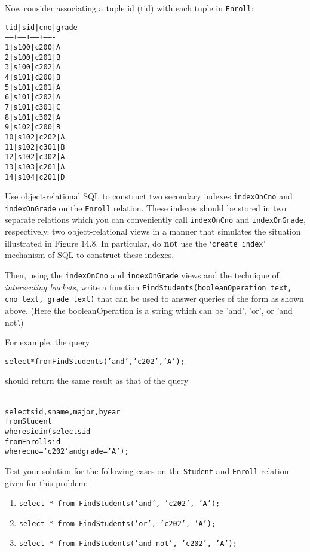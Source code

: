 \documentclass{article}
\newcommand{\blue}[1]{{\color{blue}#1}}
\begin{document}
\begin{enumerate}[resume]
Now consider associating a tuple id (tid) with each tuple in {\tt Enroll}:
{\footnotesize
\begin{alltt}
 tid | sid  | cno  | grade 
-----+------+------+-------
   1 | s100 | c200 | A
   2 | s100 | c201 | B
   3 | s100 | c202 | A
   4 | s101 | c200 | B
   5 | s101 | c201 | A
   6 | s101 | c202 | A
   7 | s101 | c301 | C
   8 | s101 | c302 | A
   9 | s102 | c200 | B
  10 | s102 | c202 | A
  11 | s102 | c301 | B
  12 | s102 | c302 | A
  13 | s103 | c201 | A
  14 | s104 | c201 | D
\end{alltt}
}

Use object-relational SQL to construct two secondary indexes {\tt indexOnCno} and {\tt indexOnGrade} on the {\tt Enroll} relation.  These indexes should be stored in two separate relations which you can conveniently call
{\tt indexOnCno} and {\tt indexOnGrade}, respectively.
two object-relational views in a manner that simulates the situation illustrated in Figure 14.8.  
In particular, do {\bf not} use the `\blue{\tt create index}' mechanism of SQL to construct these indexes.

Then, using the {\tt indexOnCno} and {\tt indexOnGrade} views and the technique of \emph{intersecting buckets}, write a function 
{\tt FindStudents(booleanOperation text, cno text, grade text)} that can be used to answer queries of the form as shown above.   (Here the booleanOperation is a string which can be 'and', 'or', or 'and not'.)

For example, the query
{\footnotesize
\begin{alltt}
\blue{select * from FindStudents('and', 'c202', 'A');}
\end{alltt}}
should return the same result as that of the query
{\footnotesize
\begin{alltt}{\blue{
select sid, sname, major, byear 
from   Student 
where  sid in (select sid
               from   Enroll sid
               where  cno = 'c202' and grade = 'A');}}
\end{alltt}  
}

Test your solution for the following cases on the {\tt Student} and {\tt Enroll} relation given for this problem:
\begin{enumerate}
\item {\tt select * from FindStudents('and', 'c202', 'A');}
\item {\tt select * from FindStudents('or', 'c202', 'A');}
\item {\tt select * from FindStudents('and not', 'c202', 'A');}
\end{enumerate}


\end{enumerate}
\end{document}
